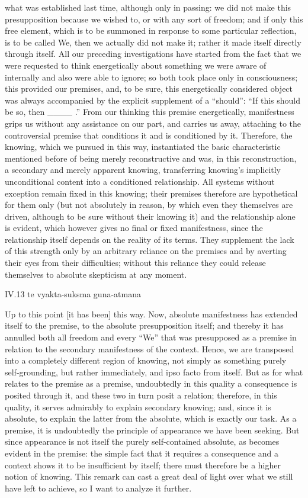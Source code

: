 what was established last time,
although only in passing:
we did not make this presupposition
because we wished to,
or with any sort of freedom;
and if only this free element,
which is to be summoned in response to
some particular reflection,
is to be called We,
then we actually did not make it;
rather it made itself directly through itself.
All our preceding investigations have started from
the fact that we were requested to think energetically
about something we were aware of internally and
also were able to ignore;
so both took place only in consciousness;
this provided our premises, and, to be sure,
this energetically considered object was always
accompanied by the explicit supplement of a “should”:
“If this should be so, then ____ .”
From our thinking this premise energetically,
manifestness grips us without any assistance on our part,
and carries us away, attaching to the controversial premise
that conditions it and is conditioned by it.
Therefore, the knowing, which we pursued in this way,
instantiated the basic characteristic mentioned before
of being merely reconstructive
and was, in this reconstruction,
a secondary and merely apparent knowing,
transferring knowing's implicitly unconditional content
into a conditioned relationship.
All systems without exception remain fixed in this knowing;
their premises therefore are hypothetical for them only
(but not absolutely in reason,
by which even they themselves are driven,
although to be sure without their knowing it)
and the relationship alone is evident,
which however gives no final or fixed manifestness,
since the relationship itself depends on
the reality of its terms.
They supplement the lack of this strength
only by an arbitrary reliance on the premises
and by averting their eyes from their difficulties;
without this reliance they could release themselves
to absolute skepticism at any moment.

IV.13
te vyakta-suksma guna-atmana

Up to this point [it has been] this way.
Now, absolute manifestness has extended itself to the premise,
to the absolute presupposition itself;
and thereby it has annulled both all freedom
and every “We” that was presupposed as a premise
in relation to the secondary manifestness of the context.
Hence, we are transposed into a
completely different region of knowing,
not simply as something purely self-grounding,
but rather immediately, and ipso facto from itself.
But as for what relates to the premise as a premise,
undoubtedly in this quality a consequence is posited through it,
and these two in turn posit a relation;
therefore, in this quality,
it serves admirably to
explain secondary knowing;
and, since it is absolute,
to explain the latter from the absolute,
which is exactly our task.
As a premise, it is undoubtedly
the principle of appearance we have been seeking.
But since appearance is not itself
the purely self-contained absolute,
as becomes evident in the premise:
the simple fact that it requires
a consequence and a context
shows it to be insufficient by itself;
there must therefore be a higher notion of knowing.
This remark can cast a great deal of light
over what we still have left to achieve,
so I want to analyze it further.

